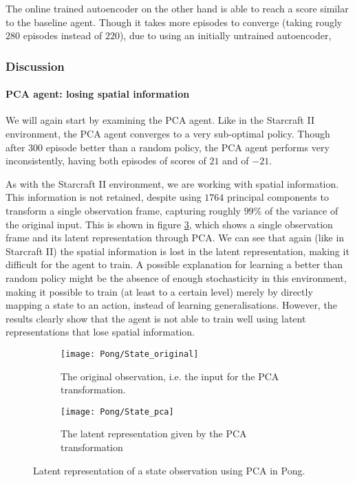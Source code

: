 The online trained autoencoder on the other hand is able to reach a score similar to the baseline agent. Though it takes more episodes to converge (taking rougly $280$ episodes instead of $220$), due to using an initially untrained autoencoder, 

\clearpage
\subsubsection{Discussion}\label{research-discussion-pong}
\paragraph{PCA agent: losing spatial information}
We will again start by examining the PCA agent. Like in the Starcraft II environment, the PCA agent converges to a very sub-optimal policy. Though after $300$ episode better than a random policy, the PCA agent performs very inconsistently, having both episodes of scores of $21$ and of $-21$.

As with the Starcraft II environment, we are working with spatial information. This information is not retained, despite using $1764$ principal components to transform a single observation frame, capturing roughly $99\%$ of the variance of the original input. This is shown in figure \ref{fig:pca-state-pong}, which shows a single observation frame and its latent representation through PCA. We can see that again (like in Starcraft II) the spatial information is lost in the latent representation, making it difficult for the agent to train. A possible explanation for learning a better than random policy might be the absence of enough stochasticity in this environment, making it possible to train (at least to a certain level) merely by directly mapping a state to an action, instead of learning generalisations. However, the results clearly show that the agent is not able to train well using latent representations that lose spatial information.


\begin{figure}[h]
	\centering
	\begin{subfigure}[b]{0.3\textwidth}
		\texttt{[image: Pong/State\_original]}
		\caption{The original observation, i.e. the input for the PCA transformation.}
		\label{fig:pca-original-pong} 
	\end{subfigure}\hfill
	\begin{subfigure}[b]{0.3\textwidth}
		\texttt{[image: Pong/State\_pca]}
		\caption{The latent representation given by the PCA transformation}
		\label{fig:pca-latent-pong}
	\end{subfigure}
	\caption{Latent representation of a state observation using PCA in Pong.}
	\label{fig:pca-state-pong}
\end{figure}

